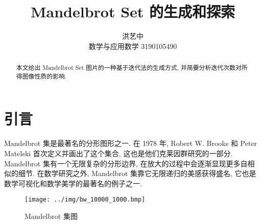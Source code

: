 \documentclass{ctexart}
\title{Mandelbrot Set 的生成和探索}
\author{洪艺中 \\ 数学与应用数学 3190105490}
\begin{document}
\maketitle

\begin{abstract}
本文给出 Mandelbrot Set 图片的一种基于迭代法的生成方式, 并简要分析迭代次数对所得图像性质的影响.
\end{abstract}
\section{引言} %
\label{sec:引言}
Mandelbrot 集是最著名的分形图形之一. 在 1978 年, Robert W. Brooks 和 Peter Matelski 首次定义并画出了这个集合, 这也是他们克莱因群研究的一部分. Mandelbrot 集有一个无限复杂的分形边界, 在放大的过程中会逐渐显现更多自相似的细节. 在数学研究之外, Mandelbrot 集靠它无限递归的美感获得盛名, 它也是数学可视化和数学美学的最著名的例子之一\cite{wiki-Madelbrot_set}. \par
\begin{figure}[htbp]
	\centering
	\texttt{[image: ../img/bw\_10000\_1000.bmp]}
	\caption{Mandelbrot 集图}
	\label{fig::intro}
\end{figure}
\end{document}
